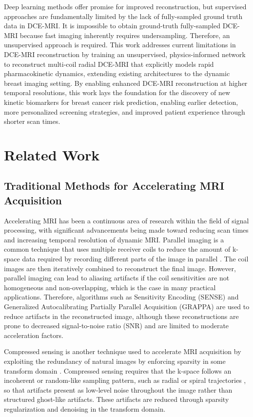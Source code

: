 \documentclass[runningheads]{llncs}
\begin{document}
Deep learning methods offer promise for improved reconstruction, but supervised approaches are fundamentally limited by the lack of fully-sampled ground truth data in DCE-MRI. It is impossible to obtain ground-truth fully-sampled DCE-MRI because fast imaging inherently requires undersampling. Therefore, an unsupervised approach is required. This work addresses current limitations in DCE-MRI reconstruction by training an unsupervised, physics-informed network to reconstruct multi-coil radial DCE-MRI that explicitly models rapid pharmacokinetic dynamics, extending existing architectures to the dynamic breast imaging setting. By enabling enhanced DCE-MRI reconstruction at higher temporal resolutions, this work lays the foundation for the discovery of new kinetic biomarkers for breast cancer risk prediction, enabling earlier detection, more personalized screening strategies, and improved patient experience through shorter scan times. 

\section{Related Work}

\subsection{Traditional Methods for Accelerating MRI Acquisition}

Accelerating MRI has been a continuous area of research within the field of signal processing, with significant advancements being made toward reducing scan times and increasing temporal resolution of dynamic MRI. Parallel imaging is a common technique that uses multiple receiver coils to reduce the amount of k-space data required by recording different parts of the image in parallel \cite{Deshmane2012Parallel}. The coil images are then iteratively combined to reconstruct the final image. However, parallel imaging can lead to aliasing artifacts if the coil sensitivities are not homogeneous and non-overlapping, which is the case in many practical applications. Therefore, algorithms such as Sensitivity Encoding (SENSE) \cite{Pruessmann1999SENSE} and Generalized Autocalibrating Partially Parallel Acquisition (GRAPPA) \cite{Griswold2002GRAPPA} are used to reduce artifacts in the reconstructed image, although these reconstructions are prone to decreased signal-to-noise ratio (SNR) and are limited to moderate acceleration factors. 

Compressed sensing is another technique used to accelerate MRI acquisition by exploiting the redundancy of natural images by enforcing sparsity in some transform domain \cite{Ye2019Compressed}. Compressed sensing requires that the k-space follows an incoherent or random-like sampling pattern, such as radial \cite{radialstackofstars} or spiral trajectories \cite{Tan2009SpiralTrajectory}, so that artifacts present as low-level noise throughout the image rather than structured ghost-like artifacts. These artifacts are reduced through sparsity regularization and denoising in the transform domain. 
\end{document}

